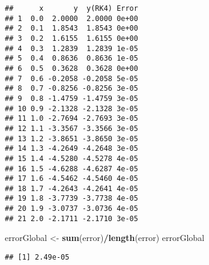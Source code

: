 \documentclass[]{article}
\newenvironment{Shaded}{\begin{snugshade}}{\end{snugshade}}
\newcommand{\KeywordTok}[1]{\textcolor[rgb]{0.13,0.29,0.53}{\textbf{#1}}}
\newcommand{\StringTok}[1]{\textcolor[rgb]{0.31,0.60,0.02}{#1}}
\newcommand{\OperatorTok}[1]{\textcolor[rgb]{0.81,0.36,0.00}{\textbf{#1}}}
\newcommand{\NormalTok}[1]{#1}
\begin{document}
\begin{verbatim}
##      x       y  y(RK4) Error
## 1  0.0  2.0000  2.0000 0e+00
## 2  0.1  1.8543  1.8543 0e+00
## 3  0.2  1.6155  1.6155 0e+00
## 4  0.3  1.2839  1.2839 1e-05
## 5  0.4  0.8636  0.8636 1e-05
## 6  0.5  0.3628  0.3628 0e+00
## 7  0.6 -0.2058 -0.2058 5e-05
## 8  0.7 -0.8256 -0.8256 3e-05
## 9  0.8 -1.4759 -1.4759 3e-05
## 10 0.9 -2.1328 -2.1328 3e-05
## 11 1.0 -2.7694 -2.7693 3e-05
## 12 1.1 -3.3567 -3.3566 3e-05
## 13 1.2 -3.8651 -3.8650 3e-05
## 14 1.3 -4.2649 -4.2648 3e-05
## 15 1.4 -4.5280 -4.5278 4e-05
## 16 1.5 -4.6288 -4.6287 4e-05
## 17 1.6 -4.5462 -4.5460 4e-05
## 18 1.7 -4.2643 -4.2641 4e-05
## 19 1.8 -3.7739 -3.7738 4e-05
## 20 1.9 -3.0737 -3.0736 4e-05
## 21 2.0 -2.1711 -2.1710 3e-05
\end{verbatim}

\begin{Shaded}
\begin{Highlighting}[]
\NormalTok{errorGlobal <-}\StringTok{ }\KeywordTok{sum}\NormalTok{(error)}\OperatorTok{/}\KeywordTok{length}\NormalTok{(error)}
\NormalTok{errorGlobal}
\end{Highlighting}
\end{Shaded}

\begin{verbatim}
## [1] 2.49e-05
\end{verbatim}
\end{document}
